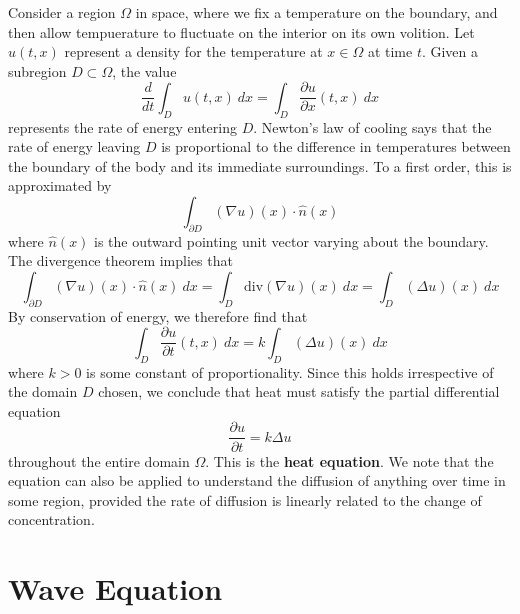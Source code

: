 Consider a region $\Omega$ in space, where we fix a temperature on the boundary, and then allow tempuerature to fluctuate on the interior on its own volition. Let $u(t,x)$ represent a density for the temperature at $x \in \Omega$ at time $t$. Given a subregion $D \subset \Omega$, the value
%
\[ \frac{d}{dt} \int_D u(t,x)\ dx = \int_D \frac{\partial u}{\partial x}(t,x)\ dx \]
%
represents the rate of energy entering $D$. Newton's law of cooling says that the rate of energy leaving $D$ is proportional to the difference in temperatures between the boundary of the body and its immediate surroundings. To a first order, this is approximated by
%
\[ \int_{\partial D} (\nabla u)(x) \cdot \widehat{n}(x) \]
%
where $\widehat{n}(x)$ is the outward pointing unit vector varying about the boundary. The divergence theorem implies that
%
\[ \int_{\partial D} (\nabla u)(x) \cdot \widehat{n}(x)\ dx = \int_D \text{div}(\nabla u)(x)\ dx = \int_D (\Delta u)(x)\ dx \]
%
By conservation of energy, we therefore find that
%
\[ \int_D \frac{\partial u}{\partial t}(t,x)\ dx = k \int_D (\Delta u)(x)\ dx \]
%
where $k > 0$ is some constant of proportionality. Since this holds irrespective of the domain $D$ chosen, we conclude that heat must satisfy the partial differential equation
%
\[ \frac{\partial u}{\partial t} = k \Delta u \]
%
throughout the entire domain $\Omega$. This is the {\bf heat equation}. We note that the equation can also be applied to understand the diffusion of anything over time in some region, provided the rate of diffusion is linearly related to the change of concentration.

\section{Wave Equation}

